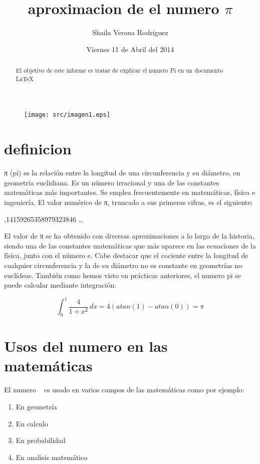 \documentclass[12pt,a4paper]{article}
\begin{document}
\begin{figure}
\begin{center}
\texttt{[image: src/imagen1.eps]}
\end{center}
\end{figure}
\author{Shaila Verona Rodriguez}
\title{aproximacion de el numero $\pi$}
\date{Viernes 11 de Abril del 2014}
\maketitle 
\tableofcontens
\begin{abstract}
El objetivo de este informe es tratar de explicar el numero Pi en un documento \LaTeX{}~\cite{Latexinf}
\end{abstract}
\section{definicion}
π (pi) es la relación entre la longitud de una circunferencia y su diámetro, en geometría euclidiana. Es un número irracional y una de las constantes matemáticas más importantes. Se emplea frecuentemente en matemáticas, física e ingeniería. El valor numérico de π, truncado a sus primeras cifras, es el siguiente:

    \pi {},14159265358979323846 \; \dots 

El valor de π se ha obtenido con diversas aproximaciones a lo largo de la historia, siendo una de las constantes matemáticas que más aparece en las ecuaciones de la física, junto con el número e. Cabe destacar que el cociente entre la longitud de cualquier circunferencia y la de su diámetro no es constante en geometrías no euclídeas.
También como hemos visto en prácticas anteriores, el numero pi se puede calcular mediante integración:

$$\int_{0}^{1} \! \frac{4}{1+x^2}\, dx = 4(atan(1) -atan(0)) = \pi $$
\section{Usos del numero \pi en las matemáticas}
El numero \pi~\cite{PI} es usado en varios campos de las matemáticas como por ejemplo:
\begin{enumerate}
\item
En geometría
\item
En calculo
\item 
En probabilidad
\item
En analisis matemático
\end {enumerate}
\end{document}
